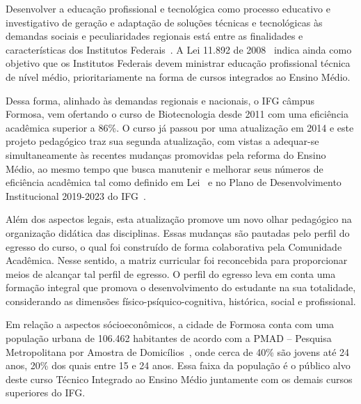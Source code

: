 \documentclass[11pt,fleqn]{book} %
\begin{document}
Desenvolver a educação profissional e tecnológica como processo educativo e investigativo de geração e adaptação de soluções técnicas e tecnológicas às demandas sociais e peculiaridades regionais está entre as finalidades e características dos Institutos Federais~\cite{Lei11892De2008}. 
A Lei 11.892 de 2008~\cite{Lei11892De2008} indica ainda como objetivo que os Institutos Federais devem ministrar educação profissional técnica de nível médio, prioritariamente na forma de cursos integrados ao Ensino Médio.

Dessa forma, alinhado às demandas regionais e nacionais, o IFG câmpus Formosa, vem ofertando o curso de Biotecnologia desde 2011 com uma eficiência acadêmica superior a 86\%.
O curso já passou por uma atualização em 2014 e este projeto pedagógico traz sua segunda atualização, com vistas a adequar-se simultaneamente às recentes mudanças promovidas pela reforma do Ensino Médio, ao mesmo tempo que busca manutenir e melhorar seus números de eficiência acadêmica tal como definido em Lei~\cite{Lei13005De2014} e no Plano de Desenvolvimento Institucional 2019-2023 do IFG~\cite{Resolucao32De2018}.

Além dos aspectos legais, esta atualização promove um novo olhar pedagógico na organização didática das disciplinas.
Essas mudanças são pautadas pelo perfil do egresso do curso, o qual foi construído de forma colaborativa pela Comunidade Acadêmica.
Nesse sentido, a matriz curricular foi reconcebida para proporcionar meios de alcançar tal perfil de egresso.
O perfil do egresso leva em conta uma formação integral que promova o desenvolvimento do estudante na sua totalidade, considerando as dimensões físico-psíquico-cognitiva, histórica, social e profissional.

Em relação a aspectos sócioeconômicos, a cidade de Formosa conta com uma população urbana de 106.462 habitantes de acordo com a PMAD – Pesquisa Metropolitana por Amostra de Domicílios~\cite{pmad2017codeplan}, onde cerca de 40\% são jovens até 24 anos, 20\% dos quais entre 15 e 24 anos. 
Essa faixa da população é o público alvo deste curso Técnico Integrado ao Ensino Médio juntamente com os demais cursos superiores do IFG.
\end{document}
